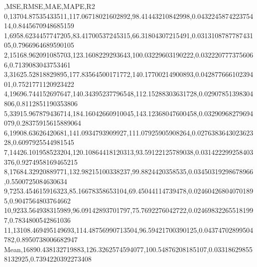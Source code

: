 ,MSE,RMSE,MAE,MAPE,R2
0,13704.87535433511,117.06718021602892,98.41443210842998,0.043224587422375414,0.8445670948685159
1,6958.6234457747205,83.41700537245315,66.31804307215491,0.031310878778743105,0.7966964689590105
2,15168.962091085703,123.1608229293643,100.03229603190222,0.0322207773756066,0.7139083043753461
3,31625.52818829895,177.83564500171772,140.17700214900893,0.04287766610239401,0.7521771120923422
4,19696.744152697647,140.34395237796548,112.15288303631728,0.02907851398304806,0.8112851190353806
5,33915.967879436714,184.16042660910045,143.12368047600458,0.03290968279694079,0.28375915615889064
6,19908.63626420681,141.0934793909927,111.07925905908264,0.027638364302362328,0.6097925544981545
7,14426.101958523204,120.10864418120313,93.59122125789038,0.031422299258403376,0.9274958169465215
8,17684.32920889771,132.98215100338237,99.8824420358535,0.03450319298678966,0.5500725084630634
9,7253.454615916323,85.16678358653104,69.45044114739478,0.024604268040701895,0.9047564803764662
10,9233.564938315989,96.09142893701797,75.7692276042722,0.024698322655181997,0.7834800542861036
11,13108.469495149693,114.48756990713504,96.59421700390125,0.04374702899504782,0.8950738006682947
Mean,16890.438132719883,126.3262574594077,100.54876208185107,0.033186298558132925,0.7394220392273408
